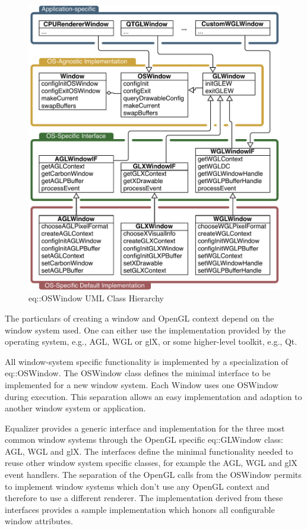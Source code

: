 \documentclass[10pt,a4]{scrartcl}
\begin{document}
\begin{figure}
  \vspace{-2ex}\includegraphics[width=.618\textwidth]{images/osWindow.pdf}
  {\caption{\label{fOSWindow}eq::OSWindow UML Class Hierarchy}}\vspace{-4ex}
\end{figure}
The particulars of creating a window and OpenGL context depend on the
window system used. One can either use the implementation provided by
the operating system, e.g., AGL, WGL or glX, or some higher-level
toolkit, e.g., Qt.

All window-system specific functionality is implemented by a
specialization of \textsf{eq::OS\-Window}. The \textsf{OSWindow} class
defines the minimal interface to be implemented for a new window
system. Each \textsf{Window} uses one \textsf{OSWindow} during
execution. This separation allows an easy implementation and adaption to
another window system or application.

Equalizer provides a generic interface and implementation for the three
most common window systems through the OpenGL specific 
\textsf{eq::GL\-Window} class: AGL, WGL and glX. The interfaces define the
minimal functionality needed to reuse other window system specific
classes, for example the AGL, WGL and glX event handlers. The separation 
of the OpenGL calls from the \textsf{OSWindow} permits to implement 
window systems which don't use any OpenGL context and therefore to use a 
different renderer. The implementation derived from these interfaces 
provides a sample implementation which honors all configurable window 
attributes.
\end{document}
